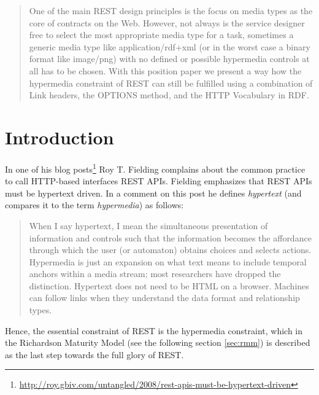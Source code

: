 \documentclass{acm_proc_article-sp}
\begin{document}
\maketitle
\begin{abstract}
One of the main REST design principles is the focus on media types as the core of contracts on the Web. However, not always is the service designer free to select the most appropriate media type for a task, sometimes a generic media type like application/rdf+xml (or in the worst case a binary format like image/png) with no defined or possible hypermedia controls at all has to be chosen. With this position paper we present a way how the hypermedia constraint of REST can still be fulfilled using a combination of Link headers, the OPTIONS method, and the HTTP Vocabulary in RDF. 
\end{abstract}




\section{Introduction}\label{sec:introduction}
In one of his blog posts\footnote{\url{http://roy.gbiv.com/untangled/2008/rest-apis-must-be-hypertext-driven}} Roy T. Fielding complains about the common practice to call HTTP-based interfaces REST APIs. Fielding emphasizes that REST APIs must be hypertext driven. In a comment on this post he defines \textit{hypertext} (and compares it to the term \textit{hypermedia}) as follows:
\begin{quote}
When I say hypertext, I mean the simultaneous presentation of information and controls such that the information becomes the affordance through which the user (or automaton) obtains choices and selects actions. Hypermedia is just an expansion on what text means to include temporal anchors within a media stream; most researchers have dropped the distinction. Hypertext does not need to be HTML on a browser. Machines can follow links when they understand the data format and relationship types.
\end{quote}
Hence, the essential constraint of REST is the hypermedia constraint, which in the Richardson Maturity Model (see the following section \ref{sec:rmm}) is described as the last step towards the full glory of REST.
\end{document}
